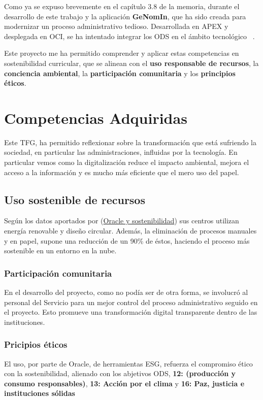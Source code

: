 
Como ya se expuso brevemente en el capítulo 3.8 de la memoria, durante el desarrollo de este trabajo y la aplicación \textbf{GeNomIn}, que ha sido creada para modernizar un proceso administrativo tedioso. Desarrollada en \acrshort{APEX} y desplegada en \acrshort{OCI}, se ha intentado integrar los \acrfull{ODS} en el ámbito tecnológico ~\cite{MarkiegiIntegrandoODSGrado}.

Este proyecto me ha permitido comprender y aplicar estas competencias en sostenibilidad curricular, que se alinean con el \textbf{uso responsable de recursos}, la\textbf{ conciencia ambiental}, la \textbf{participación comunitaria} y los \textbf{principios éticos}.

\section{Competencias Adquiridas}
Este \acrshort{TFG}, ha permitido reflexionar sobre la transformación que está sufriendo la sociedad, en particular las administraciones, influidas por la tecnología. En particular vemos como la digitalización reduce el impacto ambiental, mejora el acceso a la información y es mucho más eficiente que el mero uso del papel.

\subsection{Uso sostenible de recursos}

Según los datos aportados por (\href{https://www.oracle.com/es/sustainability/}{Oracle y sostenibilidad}) sus centros utilizan energía renovable y diseño circular. Además, la eliminación de procesos manuales y en papel, supone una reducción de un 90\% de éstos, haciendo el proceso más sostenible en un entorno en la nube.

\subsubsection{Participación comunitaria}
En el desarrollo del proyecto, como no podía ser de otra forma, se involucró al personal del Servicio para un mejor control del proceso administrativo seguido en el proyecto. Esto promueve una transformación digital transparente dentro de las instituciones.

\subsubsection{Pricipios éticos}
El uso, por parte de Oracle, de herramientas \acrfull{ESG}, refuerza el compromiso ético con la sostenibilidad, alienado con los abjetivos \acrshort{ODS}, \textbf{12: (producción
y consumo responsables)}, \textbf{13: Acción por
el clima} y \textbf{16: Paz, justicia e instituciones sólidas}

